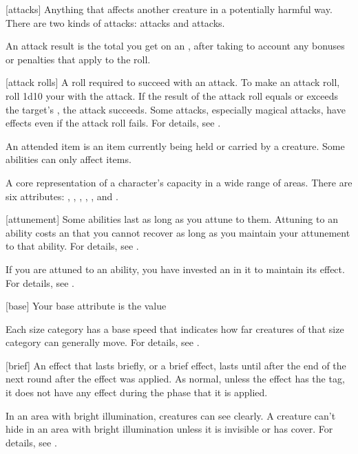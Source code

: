[attacks] Anything that affects another creature in a potentially harmful way. There are two kinds of attacks:  attacks and  attacks.

 An attack result is the total you get on an , after taking to account any bonuses or penalties that apply to the roll.

[attack rolls] A roll required to succeed with an attack.
To make an attack roll, roll 1d10 \add your  with the attack.
If the result of the attack roll equals or exceeds the target's , the attack succeeds.
Some attacks, especially magical attacks, have effects even if the attack roll fails.
For details, see .

 An attended item is an item currently being held or carried by a creature.
Some abilities can only affect  items.

 A core representation of a character's capacity in a wide range of areas. There are six attributes: , , , , , and .

[attunement] Some abilities last as long as you attune to them.
Attuning to an ability costs an  that you cannot recover as long as you maintain your attunement to that ability.
For details, see .

 If you are attuned to an ability, you have invested an  in it to maintain its effect.
For details, see .

[base] Your base attribute is the value 

 Each size category has a base speed that indicates how far creatures of that size category can generally move.
For details, see .

[brief] An effect that lasts briefly, or a brief effect, lasts until after the end of the next round after the effect was applied.
As normal, unless the effect has the  tag, it does not have any effect during the phase that it is applied.

 In an area with bright illumination, creatures can see clearly.
A creature can't hide in an area with bright illumination unless it is invisible or has cover.
For details, see .

